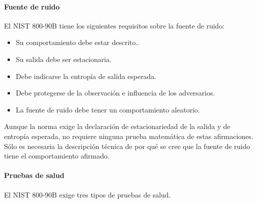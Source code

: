             \paragraph{Fuente de ruido\\}
            
                El NIST 800-90B tiene los siguientes requisitos sobre la fuente de ruido:
                
            \begin{itemize}[noitemsep]
                \item Su comportamiento debe estar descrito..
                \item Su salida debe ser estacionaria.
                \item Debe indicarse la entropía de salida esperada.
                \item Debe protegerse de la observación e influencia de los adversarios.
                \item La fuente de ruido debe tener un comportamiento aleatorio.
            \end{itemize}
            
            Aunque la norma exige la declaración de estacionariedad de la salida y de entropía esperada, no requiere ninguna prueba matemática de estas afirmaciones. Sólo es necesaria la descripción técnica de por qué se cree que la fuente de ruido tiene el comportamiento afirmado.
            
            \paragraph{Pruebas de salud\\}
            
            El NIST 800-90B exige tres tipos de pruebas de salud.
            

